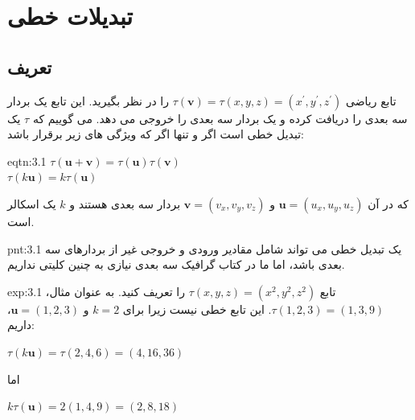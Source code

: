 \setcounter{figure}{0}
\renewcommand{\thefigure}{\arabic{figure}.\arabic{chapter}}


\section{\textbf{تبدیلات خطی}}
\label{sec:3.1}

\subsection{\textbf{تعریف}}
\label{subsec:3.1.1}
{
    \Large
    \begin{spacing}{1.5}
        تابع ریاضی $\tau(\textbf{v})=\tau(x,y,z)=(x^\prime,y^\prime,z^\prime)$ را در نظر بگیرید.
        این تابع یک بردار سه بعدی را دریافت کرده و یک بردار سه بعدی را خروجی می دهد.
        می گوییم که $\tau$ یک تبدیل خطی است اگر و تنها اگر که ویژگی های زیر برقرار باشد:

        \begin{eqtn}{eqtn:3.1}
            \centering
            $\tau(\textbf{u}+\textbf{v})=\tau(\textbf{u})\tau(\textbf{v})$\\
            $\tau(k\textbf{u})=k\tau(\textbf{u})$
        \end{eqtn}

        که در آن $\textbf{u}=(u_x,u_y,u_z)$ و $\textbf{v}=(v_x,v_y,v_z)$ بردار سه بعدی هستند و $k$ یک اسکالر است.

        \begin{point}{pnt:3.1}
            یک تبدیل خطی می تواند شامل مقادیر ورودی و خروجی غیر از بردارهای سه بعدی باشد،
            اما ما در کتاب گرافیک سه بعدی نیازی به چنین کلیتی نداریم.
        \end{point}

        \begin{example}{exp:3.1}
            \Large
            تابع $\tau(x,y,z)=(x^2,y^2,z^2)$ را تعریف کنید.
            به عنوان مثال، $\tau(1,2,3)=(1,3,9)$. این تابع خطی نیست زیرا برای $k=2$ و $\textbf{u}=(1,2,3)$، داریم:

            \begin{center}
                $\tau(k\textbf{u})=\tau(2,4,6)=(4,16,36)$
            \end{center}

            اما

            \begin{center}
                $k\tau(\textbf{u})=2(1,4,9)=(2,8,18)$
            \end{center}


\end{example}
\end{spacing}}
